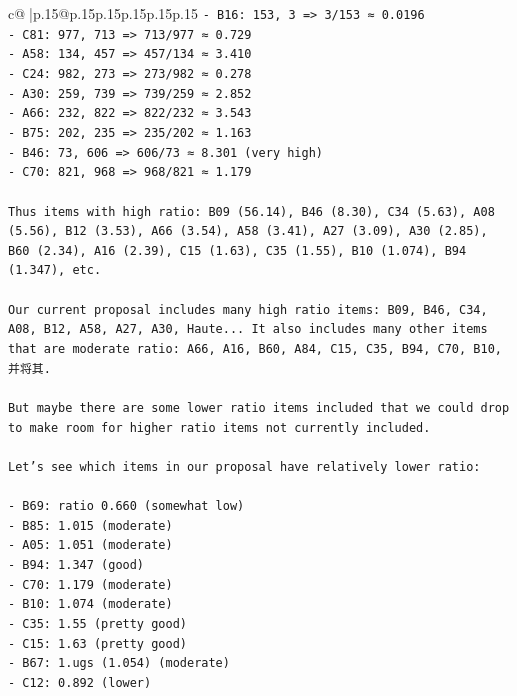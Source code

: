 \documentclass{article}
\begin{document}
{\begin{supertabular}{c@{$\;$}|p{.15\linewidth}@{}p{.15\linewidth}p{.15\linewidth}p{.15\linewidth}p{.15\linewidth}p{.15\linewidth}}
{{{\texttt{{-} B16: 153, 3 => 3/153 ≈ 0.0196} \\
\texttt{{-} C81: 977, 713 => 713/977 ≈ 0.729} \\
\texttt{{-} A58: 134, 457 => 457/134 ≈ 3.410} \\
\texttt{{-} C24: 982, 273 => 273/982 ≈ 0.278} \\
\texttt{{-} A30: 259, 739 => 739/259 ≈ 2.852} \\
\texttt{{-} A66: 232, 822 => 822/232 ≈ 3.543} \\
\texttt{{-} B75: 202, 235 => 235/202 ≈ 1.163} \\
\texttt{{-} B46: 73, 606 => 606/73 ≈ 8.301 (very high)} \\
\texttt{{-} C70: 821, 968 => 968/821 ≈ 1.179} \\
\\ 
\texttt{Thus items with high ratio: B09 (56.14), B46 (8.30), C34 (5.63), A08 (5.56), B12 (3.53), A66 (3.54), A58 (3.41), A27 (3.09), A30 (2.85), B60 (2.34), A16 (2.39), C15 (1.63), C35 (1.55), B10 (1.074), B94 (1.347), etc.} \\
\\ 
\texttt{Our current proposal includes many high ratio items: B09, B46, C34, A08, B12, A58, A27, A30, Haute... It also includes many other items that are moderate ratio: A66, A16, B60, A84, C15, C35, B94, C70, B10,并将其.} \\
\\ 
\texttt{But maybe there are some lower ratio items included that we could drop to make room for higher ratio items not currently included.} \\
\\ 
\texttt{Let's see which items in our proposal have relatively lower ratio:} \\
\\ 
\texttt{{-} B69: ratio 0.660 (somewhat low)} \\
\texttt{{-} B85: 1.015 (moderate)} \\
\texttt{{-} A05: 1.051 (moderate)} \\
\texttt{{-} B94: 1.347 (good)} \\
\texttt{{-} C70: 1.179 (moderate)} \\
\texttt{{-} B10: 1.074 (moderate)} \\
\texttt{{-} C35: 1.55 (pretty good)} \\
\texttt{{-} C15: 1.63 (pretty good)} \\
\texttt{{-} B67: 1.ugs (1.054) (moderate)} \\
\texttt{{-} C12: 0.892 (lower)} \\
}}}
\end{supertabular}}
\end{document}
